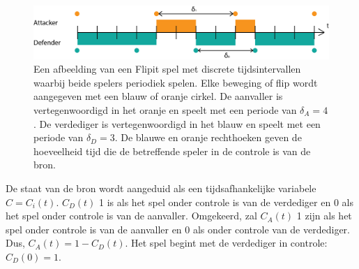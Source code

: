 \documentclass[master=cws, masteroption=vs]{kulemt}
\begin{document}
\begin{abstract*}
\begin{figure}[hbtp]
\center
\includegraphics[scale=0.5]{../../doc/template/Images/DefFlipit}
\caption{Een afbeelding van een Flipit spel met discrete tijdsintervallen waarbij beide spelers periodiek spelen. Elke beweging of flip wordt aangegeven met een blauw of oranje cirkel. De aanvaller is vertegenwoordigd in het oranje en speelt met een periode van $ \delta_{A} = 4 $. De verdediger is vertegenwoordigd in het blauw en speelt met een periode van $ \delta_{D} = 3 $. De blauwe en oranje rechthoeken geven de hoeveelheid tijd die de betreffende speler in de controle is van de bron.}
\label{fig: FLipItDefault}
\end{figure}



De staat van de bron wordt aangeduid als een tijdsafhankelijke variabele $ C = C_{i}(t) $.
$ C_{D}(t) $ 1 is als het spel onder controle is van de verdediger en 0 als het spel onder controle is van de aanvaller. Omgekeerd, zal $ C_{A}(t) $ 1 zijn als het spel onder controle is van de aanvaller en 0 als onder controle van de verdediger. Dus, $ C_{A}(t) = 1 - C_{D}(t) $.
Het spel begint met de verdediger in controle: $ C_{D}(0) = 1 $. \\



\end{abstract*}
\end{document}
